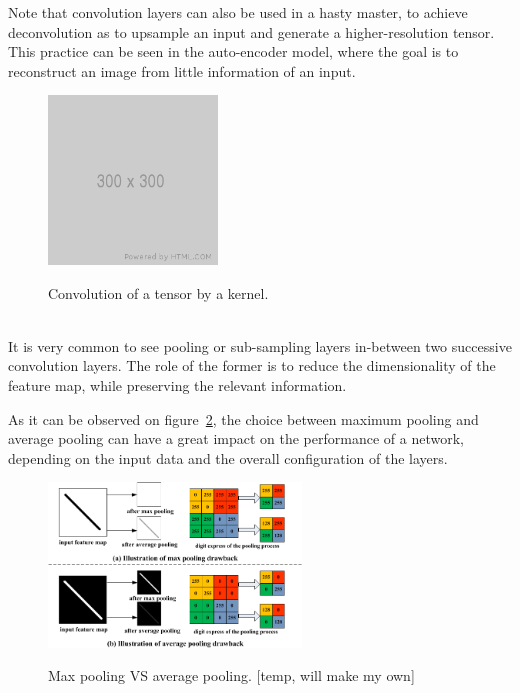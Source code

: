 Note that convolution layers can also be used in a hasty master, to achieve
deconvolution as to upsample an input and generate a higher-resolution tensor.
This practice can be seen in the auto-encoder model, where the goal is to
reconstruct an image from little information of an input.

\begin{figure}[h]
	\center
	\includegraphics[width=0.4\textwidth]{figure/300x300.png}
	\label{fig:convolution}
	\caption{Convolution of a tensor by a kernel.}
\end{figure}


~\\It is very common to see pooling or sub-sampling layers in-between two
successive convolution layers. The role of the former is to reduce the
dimensionality of the feature map, while preserving the relevant information.

As it can be observed on figure~\ref{fig:pooling}, the choice between maximum
pooling and average pooling can have a great impact on the performance of a
network, depending on the input data and the overall configuration of the
layers. 

\begin{figure}[h]
	\center
	\includegraphics[width=0.6\textwidth]{figure/max_vs_avrg_pooling.png}
	\label{fig:pooling}
	\caption{Max pooling VS average pooling. [temp, will make my own]}
\end{figure}

